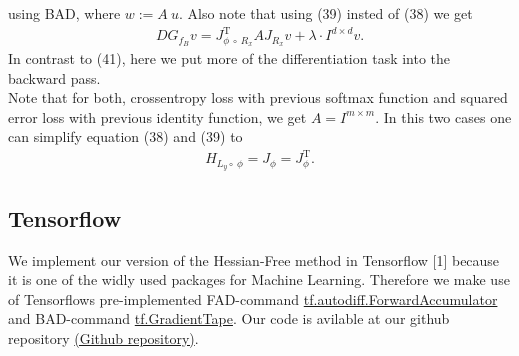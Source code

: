 \documentclass[conference]{IEEEtran}
\begin{document}
using BAD, where $w := A\:u$. Also note that using (39) insted of (38) we get 
\begin{align}
DG_{f_{B}}v  = J_{\phi\:\circ\:R _{x}}^{\mathrm{T}}AJ_{R _{x}}v + \lambda\cdot I^{d\times d}v.
\end{align}
In contrast to (41), here we put more of the differentiation task into the backward pass.\\ 
Note that for both, crossentropy loss with previous softmax function and squared error loss with previous identity function, we get $A = I^{m\times m}$. In this two cases one can simplify equation (38) and (39) to 
\begin{align}
H_{L_{y}\circ\:\phi} = J_{\phi} = J_{\phi}^{\mathrm{T}}.
\end{align}




\subsection{Tensorflow}
\noindent
We implement our version of the Hessian-Free method in Tensorflow [1] because it is one of the widly used packages for Machine Learning.
Therefore we make use of Tensorflows pre-implemented FAD-command \href{https://www.tensorflow.org/api_docs/python/tf/autodiff/ForwardAccumulator}{tf.autodiff.ForwardAccumulator} and BAD-command \href{https://www.tensorflow.org/api_docs/python/tf/GradientTape}{tf.GradientTape}. Our code is avilable at our github repository \href{https://github.com/NiklasBrunn/Hessian_Free_Optimization_of_Deep_Neural_Networks}{(Github repository)}.
\end{document}
